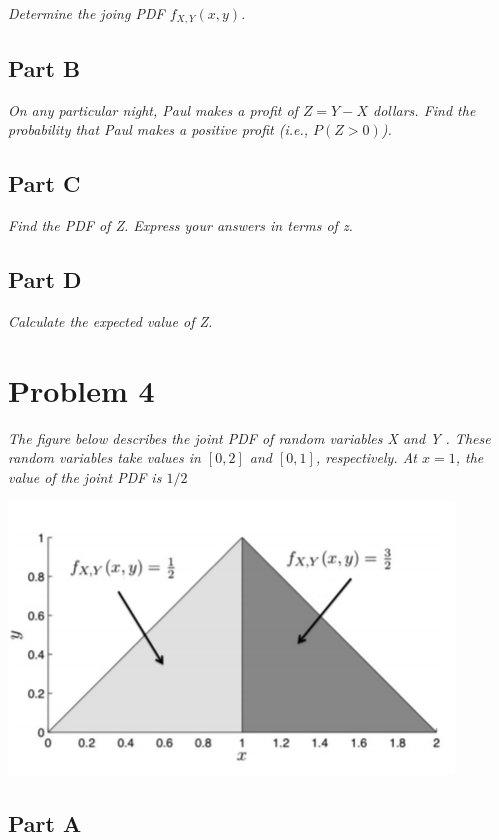 \documentclass{article}
\begin{document}
\textit{Determine the joing PDF $ f_{X,Y}(x, y) $.}

\subsection*{Part B}

\textit{On any particular night, Paul makes a profit of $ Z = Y - X $ dollars.
Find the probability that Paul makes a positive profit (i.e., $ P(Z > 0)$). }

\subsection*{Part C}

\textit{Find the PDF of Z. Express your answers in terms of z.}

\subsection*{Part D}

\textit{Calculate the expected value of Z.}

\section*{Problem 4}

\textit{The figure below describes the joint PDF of random variables X and Y
. These random variables take values in $[0, 2]$ and $[0, 1]$, respectively.
At $x = 1$, the value of the joint PDF is $1/2$}

\begin{center}
    \includegraphics[scale=1]{Images/P4.PNG}
\end{center}

\subsection*{Part A}
\end{document}
